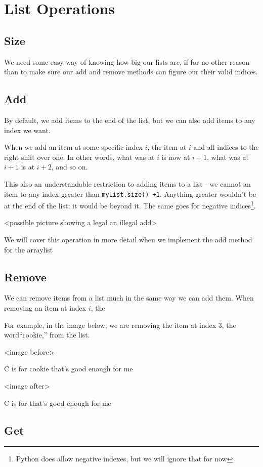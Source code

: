 \section{List Operations}


\subsection{Size} We need some easy way of knowing how big our lists are, if for no other reason than to make sure our  add and remove methods can figure our their valid indices.


\subsection{Add}  By default, we add items to the end of the list, but we can also add items to any index we want.

When we add an item at some specific index $ i $, the item at $ i $ and all indices to the right shift over one.  In other words, what was at $ i $ is now at $ i+1 $, what was at $ i+1 $ is at $ i+2 $,  and so on.

This also an understandable restriction to adding items to a list -  we cannot an item to any index greater than \texttt{myList.size() +1}.   Anything greater wouldn't be at the end of the list; it would be beyond it.  The same goes for negative indices\footnote{Python does allow negative indexes, but we will ignore that for now}.
 
<possible picture showing a legal an illegal add>

We will cover this operation in more detail when we implement the add method for the arraylist 

\subsection{Remove}  We can remove items from a list much in the same way we can add them. When removing an item at index $i$, the 

For example, in the image below, we are removing the item at index 3, the word``cookie,'' from the list.


<image before>

C is for cookie that's good enough for me 

<image after>

C is for that's good enough for me 

\subsection{Get}

